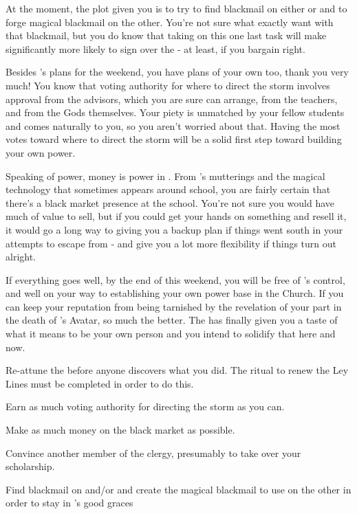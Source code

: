 \documentclass[char]{GL2020}
\begin{document}
At the moment, the plot \cAntiChup{\they} \cAntiChup{\have} given you is to try to find blackmail on either \cInitiate{} or \cPirate{} and to forge magical blackmail on the other. You’re not sure what exactly \cAntiChup{\they} want\cAntiChup{\plural} with that blackmail, but you do know that taking on this one last task will make \cAntiChup{} significantly more likely to sign over the \iScholarship{} - at least, if you bargain right.

Besides \cAntiChup{}’s plans for the weekend, you have plans of your own too, thank you very much! You know that voting authority for where to direct the storm involves approval from the advisors, which you are sure \cAntiChup{} can arrange, from the teachers, and from the Gods themselves. Your piety is unmatched by your fellow students and comes naturally to you, so you aren’t worried about that. Having the most votes toward where to direct the storm will be a solid first step toward building your own power.

Speaking of power, money is power in \pTech{}. From \cAntiChup{}’s mutterings and the magical technology that sometimes appears around school, you are fairly certain that there’s a black market presence at the school. You’re not sure you would have much of value to sell, but if you could get your hands on something and resell it, it would go a long way to giving you a backup plan if things went south in your attempts to escape from \cAntiChup{} - and give you a lot more flexibility if things turn out alright.

If everything goes well, by the end of this weekend, you will be free of \cAntiChup{}’s control, and well on your way to establishing your own power base in the Church. If you can keep your reputation from being tarnished by the revelation of your part in the death of \cEbb{}’s Avatar, so much the better. The \pSchool{} has finally given you a taste of what it means to be your own person and you intend to solidify that here and now.

\begin{itemz}[Goals]
	\item Re-attune the \iNet{} before anyone discovers what you did. The ritual to renew the Ley Lines must be completed in order to do this.
	\item Earn as much voting authority for directing the storm as you can.
	\item Make as much money on the black market as possible.
	\item Convince another member of the \pTech{} clergy, presumably \cBeetle{} to take over your scholarship.
	\item Find blackmail on \cInitiate{} and/or \cPirate{} and create the magical blackmail to use on the other in order to stay in \cAntiChup{}’s good graces
\end{itemz}
\end{document}
